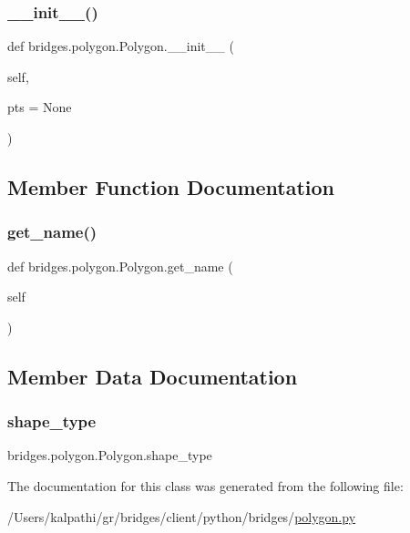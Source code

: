 \subsubsection{\texorpdfstring{\+\_\+\+\_\+init\+\_\+\+\_\+()}{\_\_init\_\_()}}
{\footnotesize\ttfamily def bridges.\+polygon.\+Polygon.\+\_\+\+\_\+init\+\_\+\+\_\+ (\begin{DoxyParamCaption}\item[{}]{self,  }\item[{}]{pts = {\ttfamily None} }\end{DoxyParamCaption})}



\subsection{Member Function Documentation}
\mbox{\label{classbridges_1_1polygon_1_1_polygon_afa0d94f62a19b24ad3764bc900718346}} 
\subsubsection{\texorpdfstring{get\+\_\+name()}{get\_name()}}
{\footnotesize\ttfamily def bridges.\+polygon.\+Polygon.\+get\+\_\+name (\begin{DoxyParamCaption}\item[{}]{self }\end{DoxyParamCaption})}



\subsection{Member Data Documentation}
\mbox{\label{classbridges_1_1polygon_1_1_polygon_ae9c67cb9337ec5deebf1e334e84b3635}} 
\subsubsection{\texorpdfstring{shape\+\_\+type}{shape\_type}}
{\footnotesize\ttfamily bridges.\+polygon.\+Polygon.\+shape\+\_\+type}



The documentation for this class was generated from the following file\+:\begin{DoxyCompactItemize}
\item 
/\+Users/kalpathi/gr/bridges/client/python/bridges/\mbox{\hyperlink{polygon_8py}{polygon.\+py}}\end{DoxyCompactItemize}
